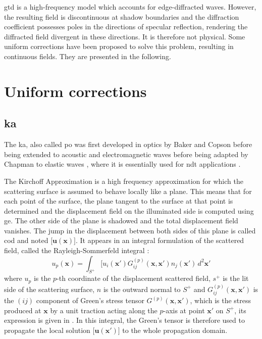 \acrshort{gtd} is a high-frequency model which accounts for edge-diffracted waves. However, the resulting field is discontinuous at shadow boundaries and the diffraction coefficient possesses poles in the directions of specular reflection, rendering the diffracted field divergent in these directions. It is therefore not physical. Some uniform corrections have been proposed to solve this problem, resulting in continuous fields. They are presented in the following. 

\section{Uniform corrections}
\label{sectUnif}
\subsection{\acrfull{ka}}
\label{sectKA}
The \acrfull{ka}, also called \acrfull{po} was first developed in optics by Baker and Copson \cite{POoptics} before being extended to acoustic and electromagnetic waves \cite{POtechreport, POLewis} before being adapted by Chapman to elastic waves \cite{POChapman}, where it is essentially used for \acrshort{ndt} applications \cite{Schmerr,Dorval}.

The Kirchoff Approximation is a high frequency approximation for which the scattering surface is assumed to behave locally like a plane. This means that for each point of the surface, the plane tangent to the surface at that point is determined and the displacement field on the illuminated side is computed using \acrshort{ge}. The other side of the plane is shadowed and the total displacement field vanishes. The jump in the displacement between both sides of this plane is called \acrfull{cod} and noted $\lbrack \mathbf{u}(\mathbf{x}) \rbrack$. It appears in an integral formulation of the scattered field, called the Rayleigh-Sommerfeld integral \cite{POChapman} :
\begin{equation}
u_p(\mathbf{x})=\int_{S^+}\lbrack u_i(\mathbf{x'})G_{ij}^{(p)}(\mathbf{x},\mathbf{x'})n_j(\mathbf{x'})\,d^2\mathbf{x'}
\label{intKA}
\end{equation}
where $u_p$ is the $p$-th coordinate of the displacement scattered field, $s^+$ is the lit side of the scattering surface, $n$ is the outward normal to $S^+$ and $G_{ij}^{(p)}(\mathbf{x},\mathbf{x'})$ is the $(ij)$ component of Green's stress tensor $G^{(p)}(\mathbf{x},\mathbf{x'})$, which is the stress produced at $\mathbf{x}$ by a unit traction acting along the $p$-axis at point $\mathbf{x'}$ on $S^+$, its expression is given in \cite{POChapman}. In this integral, the Green's tensor is therefore used to propagate the local solution $\lbrack \mathbf{u}(\mathbf{x'}) \rbrack$ to the whole propagation domain.


